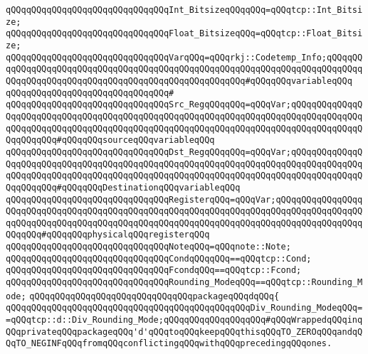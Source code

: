 \newline
\verb|qQQqqQQqqQQqqQQqqQQqqQQqqQQqqQQqInt_BitsizeqQQqqQQq=qQQqtcp::Int_Bitsize;|\newline
\newline
\verb|qQQqqQQqqQQqqQQqqQQqqQQqqQQqqQQqFloat_BitsizeqQQq=qQQqtcp::Float_Bitsize;|\newline
\newline
\verb|qQQqqQQqqQQqqQQqqQQqqQQqqQQqqQQqVarqQQq=qQQqrkj::Codetemp_Info;qQQqqQQqqQQqqQQqqQQqqQQqqQQqqQQqqQQqqQQqqQQqqQQqqQQqqQQqqQQqqQQqqQQqqQQqqQQqqQQqqQQqqQQqqQQqqQQqqQQqqQQqqQQqqQQqqQQqqQQqqQQq#qQQqqQQqvariableqQQq|\newline
\verb|qQQqqQQqqQQqqQQqqQQqqQQqqQQqqQQq#|\newline
\verb|qQQqqQQqqQQqqQQqqQQqqQQqqQQqqQQqSrc_RegqQQqqQQq=qQQqVar;qQQqqQQqqQQqqQQqqQQqqQQqqQQqqQQqqQQqqQQqqQQqqQQqqQQqqQQqqQQqqQQqqQQqqQQqqQQqqQQqqQQqqQQqqQQqqQQqqQQqqQQqqQQqqQQqqQQqqQQqqQQqqQQqqQQqqQQqqQQqqQQqqQQqqQQqqQQqqQQqqQQq#qQQqqQQqsourceqQQqvariableqQQq|\newline
\verb|qQQqqQQqqQQqqQQqqQQqqQQqqQQqqQQqDst_RegqQQqqQQq=qQQqVar;qQQqqQQqqQQqqQQqqQQqqQQqqQQqqQQqqQQqqQQqqQQqqQQqqQQqqQQqqQQqqQQqqQQqqQQqqQQqqQQqqQQqqQQqqQQqqQQqqQQqqQQqqQQqqQQqqQQqqQQqqQQqqQQqqQQqqQQqqQQqqQQqqQQqqQQqqQQqqQQqqQQq#qQQqqQQqDestinationqQQqvariableqQQq|\newline
\verb|qQQqqQQqqQQqqQQqqQQqqQQqqQQqqQQqRegisterqQQq=qQQqVar;qQQqqQQqqQQqqQQqqQQqqQQqqQQqqQQqqQQqqQQqqQQqqQQqqQQqqQQqqQQqqQQqqQQqqQQqqQQqqQQqqQQqqQQqqQQqqQQqqQQqqQQqqQQqqQQqqQQqqQQqqQQqqQQqqQQqqQQqqQQqqQQqqQQqqQQqqQQqqQQqqQQq#qQQqqQQqphysicalqQQqregisterqQQq|\newline
\newline
\verb|qQQqqQQqqQQqqQQqqQQqqQQqqQQqqQQqNoteqQQq=qQQqnote::Note;|\newline
\newline
\verb|qQQqqQQqqQQqqQQqqQQqqQQqqQQqqQQqCondqQQqqQQq==qQQqtcp::Cond;|\newline
\verb|qQQqqQQqqQQqqQQqqQQqqQQqqQQqqQQqFcondqQQq==qQQqtcp::Fcond;|\newline
\verb|qQQqqQQqqQQqqQQqqQQqqQQqqQQqqQQqRounding_ModeqQQq==qQQqtcp::Rounding_Mode;|\newline
\verb|qQQqqQQqqQQqqQQqqQQqqQQqqQQqqQQqpackageqQQqdqQQq{|\newline
\verb|qQQqqQQqqQQqqQQqqQQqqQQqqQQqqQQqqQQqqQQqqQQqqQQqDiv_Rounding_ModeqQQq==qQQqtcp::d::Div_Rounding_Mode;qQQqqQQqqQQqqQQqqQQq#qQQqWrappedqQQqinqQQqprivateqQQqpackageqQQq'd'qQQqtoqQQqkeepqQQqthisqQQqTO_ZEROqQQqandqQQqTO_NEGINFqQQqfromqQQqconflictingqQQqwithqQQqprecedingqQQqones.|\newline
